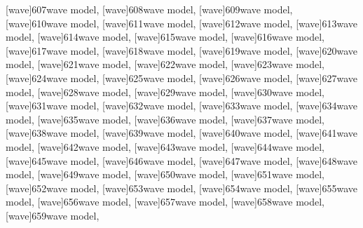 \documentclass[a4paper,11pt]{article}
\begin{document}
[wave]{607}{wave model},
[wave]{608}{wave model},
[wave]{609}{wave model}, \\[0.7em]
[wave]{610}{wave model},
[wave]{611}{wave model},
[wave]{612}{wave model},
[wave]{613}{wave model},
[wave]{614}{wave model},
[wave]{615}{wave model},
[wave]{616}{wave model}, \\[0.7em]
[wave]{617}{wave model},
[wave]{618}{wave model},
[wave]{619}{wave model},
[wave]{620}{wave model},
[wave]{621}{wave model},
[wave]{622}{wave model},
[wave]{623}{wave model}, \\[0.7em]
[wave]{624}{wave model},
[wave]{625}{wave model},
[wave]{626}{wave model},
[wave]{627}{wave model},
[wave]{628}{wave model},
[wave]{629}{wave model},
[wave]{630}{wave model}, \\[0.7em]
[wave]{631}{wave model},
[wave]{632}{wave model},
[wave]{633}{wave model},
[wave]{634}{wave model},
[wave]{635}{wave model},
[wave]{636}{wave model},
[wave]{637}{wave model}, \\[0.7em]
[wave]{638}{wave model},
[wave]{639}{wave model},
[wave]{640}{wave model},
[wave]{641}{wave model},
[wave]{642}{wave model},
[wave]{643}{wave model},
[wave]{644}{wave model}, \\[0.7em]
[wave]{645}{wave model},
[wave]{646}{wave model},
[wave]{647}{wave model},
[wave]{648}{wave model},
[wave]{649}{wave model},
[wave]{650}{wave model},
[wave]{651}{wave model}, \\[0.7em]
[wave]{652}{wave model},
[wave]{653}{wave model},
[wave]{654}{wave model},
[wave]{655}{wave model},
[wave]{656}{wave model},
[wave]{657}{wave model},
[wave]{658}{wave model}, \\[0.7em]
[wave]{659}{wave model},
\end{document}
